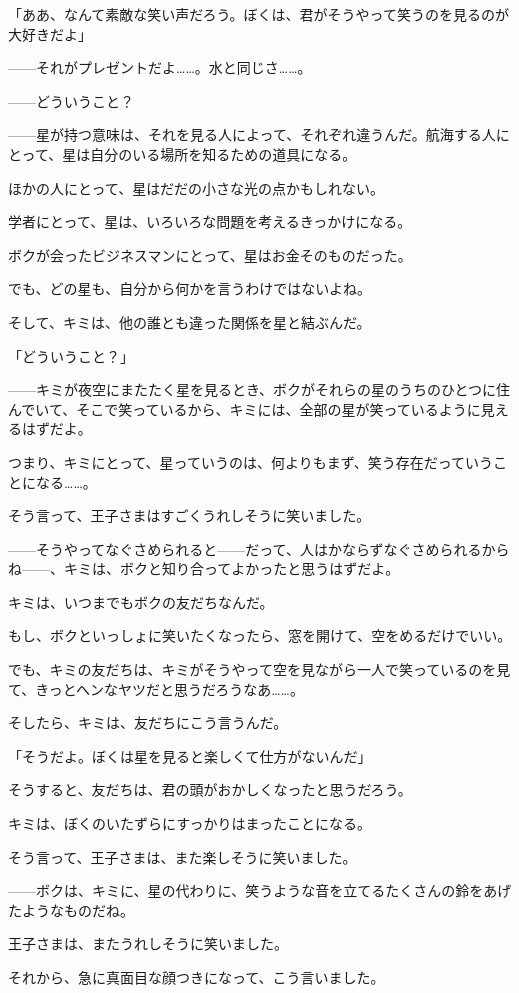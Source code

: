 「ああ、なんて素敵な笑い声だろう。ぼくは、君がそうやって笑うのを見るのが大好きだよ」

——それがプレゼントだよ……。水と同じさ……。

——どういうこと？

——星が持つ意味は、それを見る人によって、それぞれ違うんだ。航海する人にとって、星は自分のいる場所を知るための道具になる。

ほかの人にとって、星はだだの小さな光の点かもしれない。

学者にとって、星は、いろいろな問題を考えるきっかけになる。

ボクが会ったビジネスマンにとって、星はお金そのものだった。

でも、どの星も、自分から何かを言うわけではないよね。

そして、キミは、他の誰とも違った関係を星と結ぶんだ。

「どういうこと？」

——キミが夜空にまたたく星を見るとき、ボクがそれらの星のうちのひとつに住んでいて、そこで笑っているから、キミには、全部の星が笑っているように見えるはずだよ。

つまり、キミにとって、星っていうのは、何よりもまず、笑う存在だっていうことになる……。

そう言って、王子さまはすごくうれしそうに笑いました。

——そうやってなぐさめられると——だって、人はかならずなぐさめられるからね——、キミは、ボクと知り合ってよかったと思うはずだよ。

キミは、いつまでもボクの友だちなんだ。

もし、ボクといっしょに笑いたくなったら、窓を開けて、空をめるだけでいい。

でも、キミの友だちは、キミがそうやって空を見ながら一人で笑っているのを見て、きっとへンなヤツだと思うだろうなあ……。

そしたら、キミは、友だちにこう言うんだ。

「そうだよ。ぼくは星を見ると楽しくて仕方がないんだ」

そうすると、友だちは、君の頭がおかしくなったと思うだろう。

キミは、ぼくのいたずらにすっかりはまったことになる。

そう言って、王子さまは、また楽しそうに笑いました。

——ボクは、キミに、星の代わりに、笑うような音を立てるたくさんの鈴をあげたようなものだね。

王子さまは、またうれしそうに笑いました。

それから、急に真面目な顔つきになって、こう言いました。

